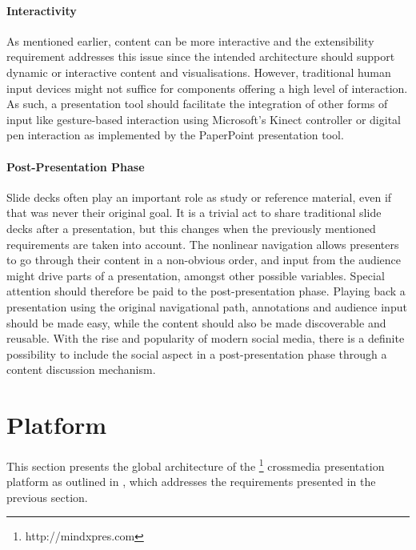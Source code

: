      \paragraph{Interactivity}

      As mentioned earlier, content can be more interactive and the
      extensibility requirement addresses this issue since the intended
      architecture should support dynamic or interactive content and
      visualisations. However, traditional human input devices might not
      suffice for components offering a high level of interaction. As such, a
      presentation tool should facilitate the integration of other forms of
      input like gesture-based interaction using Microsoft's Kinect controller
      or digital pen interaction \citep{signer-2} as implemented by the
      PaperPoint \citep{signer-1} presentation tool.

     \paragraph{Post-Presentation Phase}

      Slide decks often play an important role as study or reference material,
      even if that was never their original goal. It is a trivial act to share
      traditional slide decks after a presentation, but this changes when the
      previously mentioned requirements are taken into account. The nonlinear
      navigation allows presenters to go through their content in a non-obvious
      order, and input from the audience might drive parts of a presentation,
      amongst other possible variables. Special attention should therefore be
      paid to the post-presentation phase. Playing back a presentation using
      the original navigational path, annotations and audience input should be
      made easy, while the content should also be made discoverable and
      reusable. With the rise and popularity of modern social media, there is a
      definite possibility to include the social aspect in a post-presentation
      phase through a content discussion mechanism.

  \section{\mxp Platform}
   \label{mxp-platform}

   This section presents the global architecture of the
   \mxp\footnote{http://mindxpres.com} crossmedia presentation platform as
   outlined in , which addresses the requirements
   presented in the previous section.

